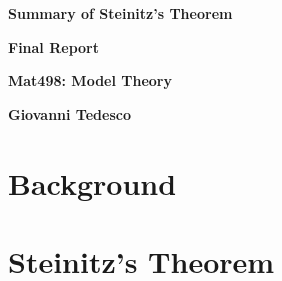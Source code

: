 \documentclass[a4paper,12pt]{article}
\begin{document}
  \begin{titlepage}
   \begin{center}
       \vspace*{1cm}
       {\huge
       \textbf{Summary of Steinitz's Theorem}}\

       \vspace{1.5cm}
       
       {\LARGE
       \textbf{Final Report}}

       \vspace*{0.5cm}

       {\Large
       \textbf{Mat498: Model Theory}}

       \vspace{0.8cm}
       \textbf{Giovanni Tedesco}
       \vspace{0.8cm}
   \end{center}
  \end{titlepage}
  \tableofcontents
  \newpage

  \section{Background}%
  \label{sec:Background}
  

  \newpage

  \section{Steinitz's Theorem}%
  \label{sec:Stenitz's Theorem}
  

  \newpage
  
  
\end{document}
